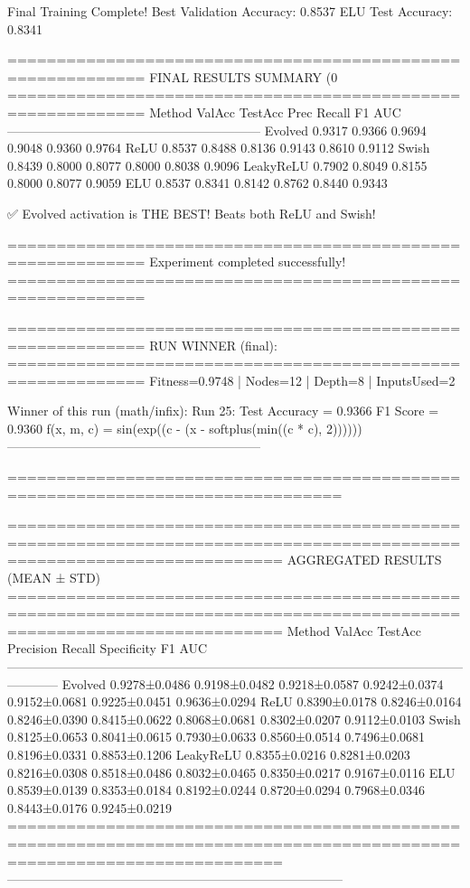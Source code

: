 Final Training Complete!
Best Validation Accuracy: 0.8537
ELU Test Accuracy: 0.8341

============================================================
FINAL RESULTS SUMMARY (0%
============================================================
Method             ValAcc     TestAcc    Prec       Recall     F1         AUC
------------------------------------------------------------
Evolved            0.9317     0.9366     0.9694     0.9048     0.9360     0.9764
ReLU               0.8537     0.8488     0.8136     0.9143     0.8610     0.9112
Swish              0.8439     0.8000     0.8077     0.8000     0.8038     0.9096
LeakyReLU          0.7902     0.8049     0.8155     0.8000     0.8077     0.9059
ELU                0.8537     0.8341     0.8142     0.8762     0.8440     0.9343

✅ Evolved activation is THE BEST! Beats both ReLU and Swish!

============================================================
Experiment completed successfully!
============================================================

============================================================
RUN WINNER (final):
============================================================
Fitness=0.9748 | Nodes=12 | Depth=8 | InputsUsed=2

Winner of this run (math/infix):
  Run 25:
     Test Accuracy = 0.9366
     F1 Score      = 0.9360
     f(x, m, c)    = sin(exp((c - (x - softplus(min((c * c), 2))))))
------------------------------------------------------------

================================================================================

========================================================================================================================
AGGREGATED RESULTS (MEAN ± STD)
========================================================================================================================
Method       ValAcc         TestAcc        Precision      Recall         Specificity  F1             AUC
------------------------------------------------------------------------------------------------------------------------
Evolved     0.9278±0.0486 0.9198±0.0482 0.9218±0.0587 0.9242±0.0374 0.9152±0.0681 0.9225±0.0451 0.9636±0.0294
ReLU        0.8390±0.0178 0.8246±0.0164 0.8246±0.0390 0.8415±0.0622 0.8068±0.0681 0.8302±0.0207 0.9112±0.0103
Swish       0.8125±0.0653 0.8041±0.0615 0.7930±0.0633 0.8560±0.0514 0.7496±0.0681 0.8196±0.0331 0.8853±0.1206
LeakyReLU   0.8355±0.0216 0.8281±0.0203 0.8216±0.0308 0.8518±0.0486 0.8032±0.0465 0.8350±0.0217 0.9167±0.0116
ELU         0.8539±0.0139 0.8353±0.0184 0.8192±0.0244 0.8720±0.0294 0.7968±0.0346 0.8443±0.0176 0.9245±0.0219
========================================================================================================================
--------------------------------------------------------------------------------

